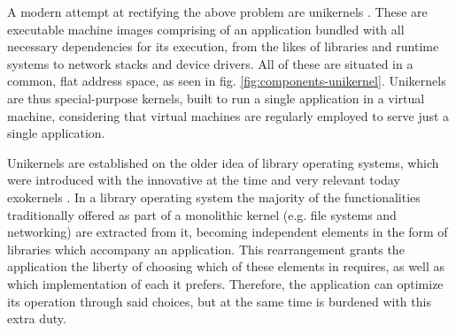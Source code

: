 A modern attempt at rectifying the above problem are unikernels \cite{mirageos}.
These are executable machine images comprising of an application bundled with
all necessary dependencies for its execution, from the likes of libraries and
runtime systems to network stacks and device drivers. All of these are situated
in a common, flat address space, as seen in fig. \ref{fig:components-unikernel}.
Unikernels are thus special-purpose kernels, built to run a single application
in a virtual machine, considering that virtual machines are regularly employed
to serve just a single application.

Unikernels are established on the older idea of library operating systems, which
were introduced with the innovative at the time and very relevant today
exokernels \cite{exokernel}. In a library operating system the majority of the
functionalities traditionally offered as part of a monolithic kernel (e.g. file
systems and networking) are extracted from it, becoming independent elements in
the form of libraries which accompany an application. This rearrangement grants
the application the liberty of choosing which of these elements in requires, as
well as which implementation of each it prefers. Therefore, the application
can optimize its operation through said choices, but at the same time is
burdened with this extra duty.

